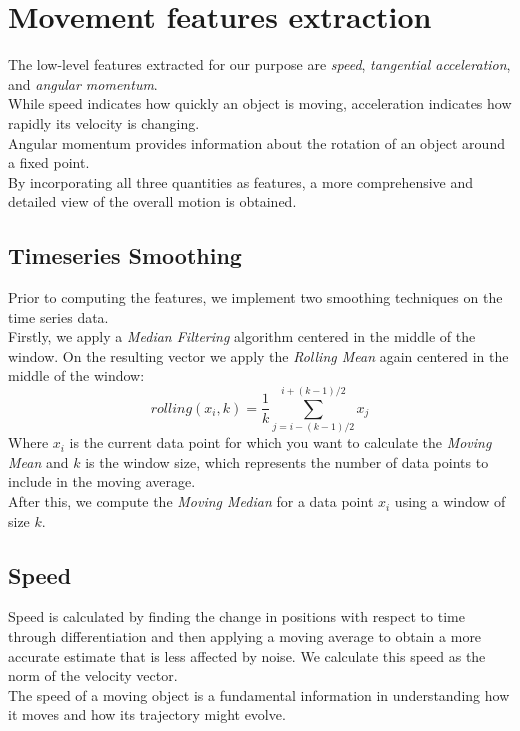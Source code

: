 \section{Movement features extraction}
\label{sec:features}
The low-level features extracted for our purpose are \textit{speed}, \textit{tangential acceleration}, and \textit{angular momentum}. \\
While speed indicates how quickly an object is moving, acceleration indicates how rapidly its velocity is changing.\\
Angular momentum provides information about the rotation of an object around a fixed point.\\
By incorporating all three quantities as features, a more comprehensive and detailed view of the overall motion is obtained.

\subsection{Timeseries Smoothing}
Prior to computing the features, we implement two smoothing techniques on the time series data. \\
Firstly, we apply a \textit{Median Filtering} algorithm centered in the middle of the window. 
On the resulting vector we apply the \textit{Rolling Mean} again centered in the middle of the window:
\begin{equation}
  rolling(x_i,k) = \frac{1}{k} \sum_{j=i-(k-1)/2}^{i+(k-1)/2} x_j
\end{equation}
Where $x_i$ is the current data point for which you want to calculate the \textit{Moving Mean} and $k$ is the window size, which represents the number of data points to include in the moving average. \\
After this, we compute the \textit{Moving Median} for a data point $x_i$ using a window of size $k$. 


\subsection{Speed}
Speed is calculated by finding the change in positions with respect to time through differentiation and then applying a moving average to obtain a more accurate estimate that is less affected by noise.
We calculate this speed as the norm of the velocity vector. \\
The speed of a moving object is a fundamental information in understanding how it moves and how its trajectory might evolve.

